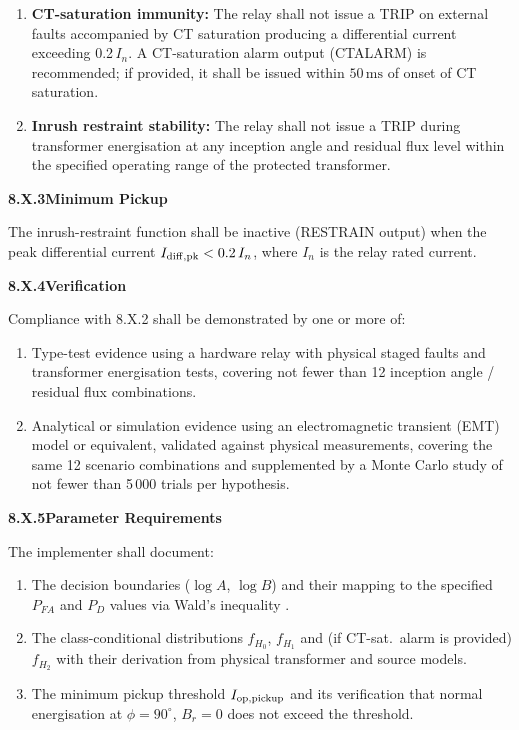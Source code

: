 \documentclass[11pt, a4paper]{article}
\newcommand{\ms}{\,\text{ms}}
\begin{document}
\begin{propbox}
\begin{enumerate}[label=(\roman*)]
    \item \textbf{CT-saturation immunity:}
      The relay shall not issue a TRIP on external faults accompanied by
      CT saturation producing a differential current exceeding 0.2\,$I_n$.
      A CT-saturation alarm output (CTALARM) is recommended; if provided,
      it shall be issued within $50\ms$ of onset of CT saturation.

    \item \textbf{Inrush restraint stability:}
      The relay shall not issue a TRIP during transformer energisation at
      any inception angle and residual flux level within the specified
      operating range of the protected transformer.
  \end{enumerate}

  \medskip
  \textbf{8.X.3\quad Minimum Pickup}

  The inrush-restraint function shall be inactive (RESTRAIN output) when the
  peak differential current $I_{\rm diff,pk} < 0.2\,I_n$, where $I_n$ is
  the relay rated current.

  \medskip
  \textbf{8.X.4\quad Verification}

  Compliance with 8.X.2 shall be demonstrated by one or more of:

  \begin{enumerate}[label=(\alph*)]
    \item Type-test evidence using a hardware relay with physical staged
      faults and transformer energisation tests, covering not fewer than
      12 inception angle / residual flux combinations.
    \item Analytical or simulation evidence using an electromagnetic transient
      (EMT) model or equivalent, validated against physical measurements,
      covering the same 12 scenario combinations and supplemented by a
      Monte Carlo study of not fewer than 5\,000 trials per hypothesis.
  \end{enumerate}

  \medskip
  \textbf{8.X.5\quad Parameter Requirements}

  The implementer shall document:
  \begin{enumerate}[label=(\roman*)]
    \item The decision boundaries ($\log A$, $\log B$) and their mapping
      to the specified $P_{FA}$ and $P_D$ values via Wald's inequality
      \cite{Wald1945,Wald1947}.
    \item The class-conditional distributions $f_{H_0}$, $f_{H_1}$ and
      (if CT-sat.\ alarm is provided) $f_{H_2}$ with their derivation from
      physical transformer and source models.
    \item The minimum pickup threshold $I_{\rm op,pickup}$ and its
      verification that normal energisation at $\phi = 90^\circ$,
      $B_r = 0$ does not exceed the threshold.
  \end{enumerate}
\end{propbox}
\end{document}
